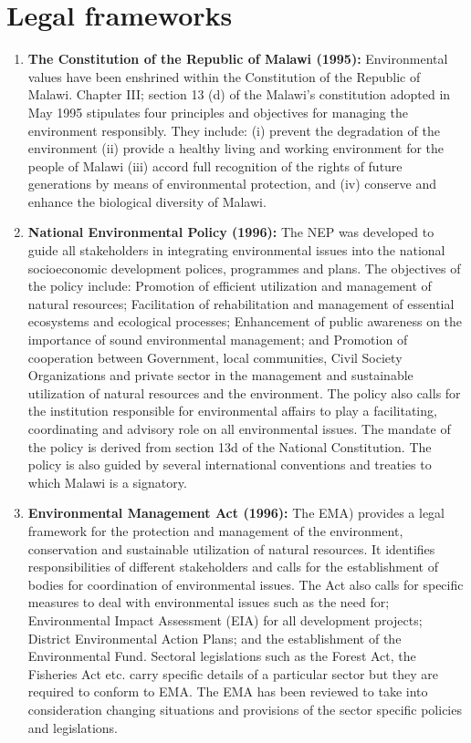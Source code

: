 \documentclass[
]{book}
\begin{document}
\hypertarget{legal-frameworks}{%
\section{Legal frameworks}\label{legal-frameworks}}

\begin{enumerate}
\def\labelenumi{\arabic{enumi}.}
\setcounter{enumi}{33}
\item
  \textbf{The Constitution of the Republic of Malawi (1995):} Environmental values have been enshrined within the Constitution of the Republic of Malawi. Chapter III; section 13 (d) of the Malawi's constitution adopted in May 1995 stipulates four principles and objectives for managing the environment responsibly. They include: (i) prevent the degradation of the environment (ii) provide a healthy living and working environment for the people of Malawi (iii) accord full recognition of the rights of future generations by means of environmental protection, and (iv) conserve and enhance the biological diversity of Malawi.
\item
  \textbf{National Environmental Policy (1996):} The NEP was developed to guide all stakeholders in integrating environmental issues into the national socioeconomic development polices, programmes and plans. The objectives of the policy include: Promotion of efficient utilization and management of natural resources; Facilitation of rehabilitation and management of essential ecosystems and ecological processes; Enhancement of public awareness on the importance of sound environmental management; and Promotion of cooperation between Government, local communities, Civil Society Organizations and private sector in the management and sustainable utilization of natural resources and the environment. The policy also calls for the institution responsible for environmental affairs to play a facilitating, coordinating and advisory role on all environmental issues. The mandate of the policy is derived from section 13d of the National Constitution. The policy is also guided by several international conventions and treaties to which Malawi is a signatory.
\item
  \textbf{Environmental Management Act (1996):} The EMA) provides a legal framework for the protection and management of the environment, conservation and sustainable utilization of natural resources. It identifies responsibilities of different stakeholders and calls for the establishment of bodies for coordination of environmental issues. The Act also calls for specific measures to deal with environmental issues such as the need for; Environmental Impact Assessment (EIA) for all development projects; District Environmental Action Plans; and the establishment of the Environmental Fund. Sectoral legislations such as the Forest Act, the Fisheries Act etc. carry specific details of a particular sector but they are required to conform to EMA. The EMA has been reviewed to take into consideration changing situations and provisions of the sector specific policies and legislations.

\end{enumerate}
\end{document}
